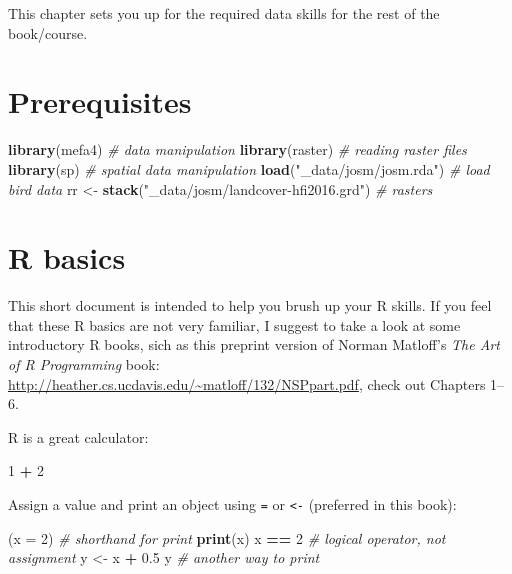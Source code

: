 \documentclass[12pt,]{book}
\newenvironment{Shaded}{\begin{snugshade}}{\end{snugshade}}
\newcommand{\CommentTok}[1]{\textcolor[rgb]{0.56,0.35,0.01}{\textit{#1}}}
\newcommand{\DataTypeTok}[1]{\textcolor[rgb]{0.13,0.29,0.53}{#1}}
\newcommand{\DecValTok}[1]{\textcolor[rgb]{0.00,0.00,0.81}{#1}}
\newcommand{\FloatTok}[1]{\textcolor[rgb]{0.00,0.00,0.81}{#1}}
\newcommand{\KeywordTok}[1]{\textcolor[rgb]{0.13,0.29,0.53}{\textbf{#1}}}
\newcommand{\NormalTok}[1]{#1}
\newcommand{\OperatorTok}[1]{\textcolor[rgb]{0.81,0.36,0.00}{\textbf{#1}}}
\newcommand{\StringTok}[1]{\textcolor[rgb]{0.31,0.60,0.02}{#1}}
\begin{document}
This chapter sets you up for the required data skills for the
rest of the book/course.

\hypertarget{prerequisites}{%
\section{Prerequisites}\label{prerequisites}}

\begin{Shaded}
\begin{Highlighting}[]
\KeywordTok{library}\NormalTok{(mefa4)                }\CommentTok{# data manipulation}
\KeywordTok{library}\NormalTok{(raster)               }\CommentTok{# reading raster files}
\KeywordTok{library}\NormalTok{(sp)                   }\CommentTok{# spatial data manipulation}
\KeywordTok{load}\NormalTok{(}\StringTok{"_data/josm/josm.rda"}\NormalTok{)   }\CommentTok{# load bird data}
\NormalTok{rr <-}\StringTok{ }\KeywordTok{stack}\NormalTok{(}\StringTok{"_data/josm/landcover-hfi2016.grd"}\NormalTok{) }\CommentTok{# rasters}
\end{Highlighting}
\end{Shaded}

\hypertarget{r-basics}{%
\section{R basics}\label{r-basics}}

This short document is intended to help you brush up your R skills.
If you feel that these R basics are not very familiar,
I suggest to take a look at some introductory R books,
sich as this preprint version of Norman Matloff's \emph{The Art of R Programming} book: \url{http://heather.cs.ucdavis.edu/~matloff/132/NSPpart.pdf}, check out Chapters 1--6.

R is a great calculator:

\begin{Shaded}
\begin{Highlighting}[]
\DecValTok{1} \OperatorTok{+}\StringTok{ }\DecValTok{2}
\end{Highlighting}
\end{Shaded}

Assign a value and print an object using \texttt{=} or \texttt{\textless{}-} (preferred in this book):

\begin{Shaded}
\begin{Highlighting}[]
\NormalTok{(}\DataTypeTok{x =} \DecValTok{2}\NormalTok{) }\CommentTok{# shorthand for print}
\KeywordTok{print}\NormalTok{(x)}
\NormalTok{x }\OperatorTok{==}\StringTok{ }\DecValTok{2} \CommentTok{# logical operator, not assignment}
\NormalTok{y <-}\StringTok{ }\NormalTok{x }\OperatorTok{+}\StringTok{ }\FloatTok{0.5}
\NormalTok{y }\CommentTok{# another way to print}
\end{Highlighting}
\end{Shaded}
\end{document}
